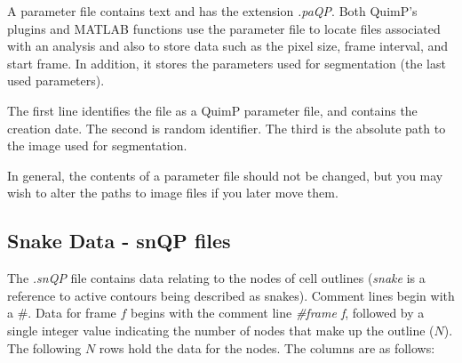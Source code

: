 \documentclass[a4paper,12pt]{article}
\begin{document}
A parameter file contains text and has the extension \textit{.paQP}.  Both QuimP's plugins and
MATLAB functions use the parameter file to locate files associated with an analysis and also to store data such as the
pixel size, frame interval, and start frame.  In addition, it stores the parameters used for segmentation
(the last used parameters).

The first line identifies the file as a QuimP parameter file, and contains the creation date.
The second is random identifier.
The third is the absolute path to the image used for segmentation.
 
In general, the contents of a parameter file should not be changed, but you may wish to alter the paths to
image files if you later move them.
 

\subsection{Snake Data - snQP files}
\label{snQP}

The \textit{.snQP} file contains data relating to the nodes of cell outlines (\textit{snake} is a reference to active contours being 
described as snakes).   Comment lines
begin with a \#.  Data for frame $f$ begins with the comment line \textit{\#frame f}, followed by a single integer value
indicating the number of nodes that make up the outline ($N$).  The following $N$ rows hold the data for the nodes. The 
columns are as follows:
\end{document}
